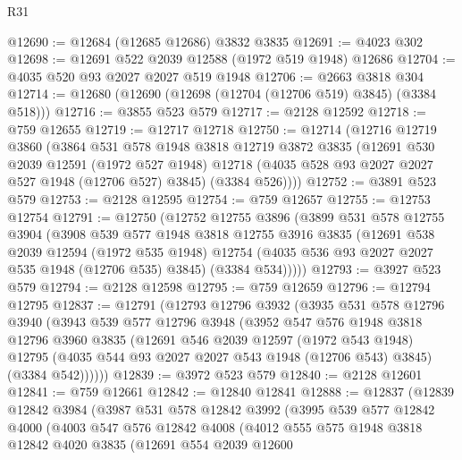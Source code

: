 \begin{lexlean}{R31}
\begin{coremodule}
@12690 := @12684 (@12685 @12686) @3832 @3835
@12691 := @4023 @302
@12698 := @12691 @522 @2039 @12588 (@1972 @519 @1948) @12686
@12704 := @4035 @520 @93 @2027 @2027 @519 @1948
@12706 := @2663 @3818 @304
@12714 := @12680 (@12690 (@12698 (@12704 (@12706 @519) @3845) (@3384 @518)))
@12716 := @3855 @523 @579
@12717 := @2128 @12592
@12718 := @759 @12655
@12719 := @12717 @12718
@12750 := @12714
    (@12716
      @12719
      @3860
      (@3864
        @531
        @578
        @1948
        @3818
        @12719
        @3872
        @3835
        (@12691
          @530
          @2039
          @12591
          (@1972 @527 @1948)
          @12718
          (@4035 @528 @93 @2027 @2027 @527 @1948 (@12706 @527) @3845)
          (@3384 @526))))
@12752 := @3891 @523 @579
@12753 := @2128 @12595
@12754 := @759 @12657
@12755 := @12753 @12754
@12791 := @12750
    (@12752
      @12755
      @3896
      (@3899
        @531
        @578
        @12755
        @3904
        (@3908
          @539
          @577
          @1948
          @3818
          @12755
          @3916
          @3835
          (@12691
            @538
            @2039
            @12594
            (@1972 @535 @1948)
            @12754
            (@4035 @536 @93 @2027 @2027 @535 @1948 (@12706 @535) @3845)
            (@3384 @534)))))
@12793 := @3927 @523 @579
@12794 := @2128 @12598
@12795 := @759 @12659
@12796 := @12794 @12795
@12837 := @12791
    (@12793
      @12796
      @3932
      (@3935
        @531
        @578
        @12796
        @3940
        (@3943
          @539
          @577
          @12796
          @3948
          (@3952
            @547
            @576
            @1948
            @3818
            @12796
            @3960
            @3835
            (@12691
              @546
              @2039
              @12597
              (@1972 @543 @1948)
              @12795
              (@4035 @544 @93 @2027 @2027 @543 @1948 (@12706 @543) @3845)
              (@3384 @542))))))
@12839 := @3972 @523 @579
@12840 := @2128 @12601
@12841 := @759 @12661
@12842 := @12840 @12841
@12888 := @12837
    (@12839
      @12842
      @3984
      (@3987
        @531
        @578
        @12842
        @3992
        (@3995
          @539
          @577
          @12842
          @4000
          (@4003
            @547
            @576
            @12842
            @4008
            (@4012
              @555
              @575
              @1948
              @3818
              @12842
              @4020
              @3835
              (@12691
                @554
                @2039
                @12600

\end{coremodule}
\end{lexlean}

